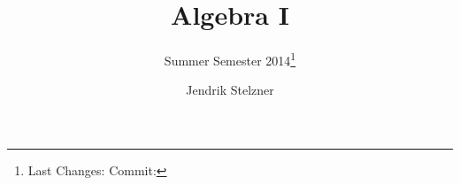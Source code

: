 \documentclass[a4paper, 10pt, oneside, openany, bibliography=totocnumbered]{scrbook}
\begin{document}
\subject{Notes for}
\title{Algebra I}
\subtitle{Summer Semester 2014\thanks{Last Changes: \gitAuthorDate \hfill Commit: \gitAbbrevHash}}
\author{Jendrik Stelzner}
\date{}

\frontmatter
\maketitle

\begingroup
\hfuzz=1pt %
\tableofcontents
\endgroup

\mainmatter






\backmatter

\end{document}
